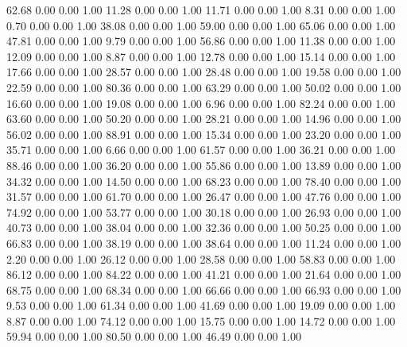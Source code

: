    62.68   0.00   0.00   1.00
   11.28   0.00   0.00   1.00
   11.71   0.00   0.00   1.00
    8.31   0.00   0.00   1.00
    0.70   0.00   0.00   1.00
   38.08   0.00   0.00   1.00
   59.00   0.00   0.00   1.00
   65.06   0.00   0.00   1.00
   47.81   0.00   0.00   1.00
    9.79   0.00   0.00   1.00
   56.86   0.00   0.00   1.00
   11.38   0.00   0.00   1.00
   12.09   0.00   0.00   1.00
    8.87   0.00   0.00   1.00
   12.78   0.00   0.00   1.00
   15.14   0.00   0.00   1.00
   17.66   0.00   0.00   1.00
   28.57   0.00   0.00   1.00
   28.48   0.00   0.00   1.00
   19.58   0.00   0.00   1.00
   22.59   0.00   0.00   1.00
   80.36   0.00   0.00   1.00
   63.29   0.00   0.00   1.00
   50.02   0.00   0.00   1.00
   16.60   0.00   0.00   1.00
   19.08   0.00   0.00   1.00
    6.96   0.00   0.00   1.00
   82.24   0.00   0.00   1.00
   63.60   0.00   0.00   1.00
   50.20   0.00   0.00   1.00
   28.21   0.00   0.00   1.00
   14.96   0.00   0.00   1.00
   56.02   0.00   0.00   1.00
   88.91   0.00   0.00   1.00
   15.34   0.00   0.00   1.00
   23.20   0.00   0.00   1.00
   35.71   0.00   0.00   1.00
    6.66   0.00   0.00   1.00
   61.57   0.00   0.00   1.00
   36.21   0.00   0.00   1.00
   88.46   0.00   0.00   1.00
   36.20   0.00   0.00   1.00
   55.86   0.00   0.00   1.00
   13.89   0.00   0.00   1.00
   34.32   0.00   0.00   1.00
   14.50   0.00   0.00   1.00
   68.23   0.00   0.00   1.00
   78.40   0.00   0.00   1.00
   31.57   0.00   0.00   1.00
   61.70   0.00   0.00   1.00
   26.47   0.00   0.00   1.00
   47.76   0.00   0.00   1.00
   74.92   0.00   0.00   1.00
   53.77   0.00   0.00   1.00
   30.18   0.00   0.00   1.00
   26.93   0.00   0.00   1.00
   40.73   0.00   0.00   1.00
   38.04   0.00   0.00   1.00
   32.36   0.00   0.00   1.00
   50.25   0.00   0.00   1.00
   66.83   0.00   0.00   1.00
   38.19   0.00   0.00   1.00
   38.64   0.00   0.00   1.00
   11.24   0.00   0.00   1.00
    2.20   0.00   0.00   1.00
   26.12   0.00   0.00   1.00
   28.58   0.00   0.00   1.00
   58.83   0.00   0.00   1.00
   86.12   0.00   0.00   1.00
   84.22   0.00   0.00   1.00
   41.21   0.00   0.00   1.00
   21.64   0.00   0.00   1.00
   68.75   0.00   0.00   1.00
   68.34   0.00   0.00   1.00
   66.66   0.00   0.00   1.00
   66.93   0.00   0.00   1.00
    9.53   0.00   0.00   1.00
   61.34   0.00   0.00   1.00
   41.69   0.00   0.00   1.00
   19.09   0.00   0.00   1.00
    8.87   0.00   0.00   1.00
   74.12   0.00   0.00   1.00
   15.75   0.00   0.00   1.00
   14.72   0.00   0.00   1.00
   59.94   0.00   0.00   1.00
   80.50   0.00   0.00   1.00
   46.49   0.00   0.00   1.00

